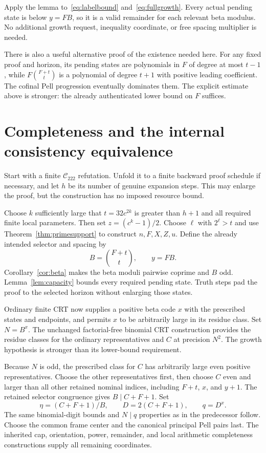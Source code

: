 \documentclass[11pt]{article}
\theoremstyle{definition}
\theoremstyle{remark}
\newcommand{\Ccal}{\mathcal C_{222}}
\begin{document}
Apply the lemma to~\eqref{eq:labelbound} and~\eqref{eq:fullgrowth}.
Every actual pending state is below $y=FB$, so it is a valid remainder
for each relevant beta modulus. No additional growth request, inequality
coordinate, or free spacing multiplier is needed.

There is also a useful alternative proof of the existence needed here.
For any fixed proof and horizon, its pending states are polynomials in $F$
of degree at most $t-1$, while $F\binom{F+t}{t}$ is a polynomial of
degree $t+1$ with positive leading coefficient. The cofinal Pell
progression eventually dominates them. The explicit estimate above is
stronger: the already authenticated lower bound on $F$ suffices.

\section{Completeness and the internal consistency equivalence}
\label{sec:complete}

Start with a finite $\Ccal$ refutation. Unfold it to a finite backward
proof schedule if necessary, and let $h$ be its number of genuine expansion
steps. This may enlarge the proof, but the construction has no imposed
resource bound.

Choose $k$ sufficiently large that $t=32c^{2k}$ is greater than $h+1$
and all required finite local parameters. Then set $z=(c^k-1)/2$.
Choose $\ell$ with $2^\ell>t$ and use
Theorem~\ref{thm:primesupport} to construct $n,F,X,Z,u$.
Define the already intended selector and spacing by
\[
 B=\binom{F+t}{t},\qquad y=FB.
\]
Corollary~\ref{cor:beta} makes the beta moduli pairwise coprime and $B$
odd. Lemma~\ref{lem:capacity} bounds every required pending state. Truth
steps pad the proof to the selected horizon without enlarging those states.

Ordinary finite CRT now supplies a positive beta code $x$ with the
prescribed states and endpoints, and permits $x$ to be arbitrarily large
in its residue class. Set $N=B^x$. The unchanged factorial-free
binomial CRT construction provides the residue classes for the ordinary
representatives and $C$ at precision $N^2$. The growth hypothesis is
stronger than its lower-bound requirement.

Because $N$ is odd, the prescribed class for $C$ has arbitrarily large
even positive representatives. Choose the other representatives first,
then choose $C$ even and larger than all other retained nominal indices,
including $F+t$, $x$, and $y+1$. The retained selector congruence gives
$B\mid C+F+1$. Set
\[
 \eta=(C+F+1)/B,\qquad D=2(C+F+1),\qquad q=D^x.
\]
The same binomial-digit bounds and $N\mid q$ properties as in the
predecessor follow. Choose the common frame center and the canonical
principal Pell pairs last. The inherited cap, orientation, power,
remainder, and local arithmetic completeness constructions supply all
remaining coordinates.
\end{document}
